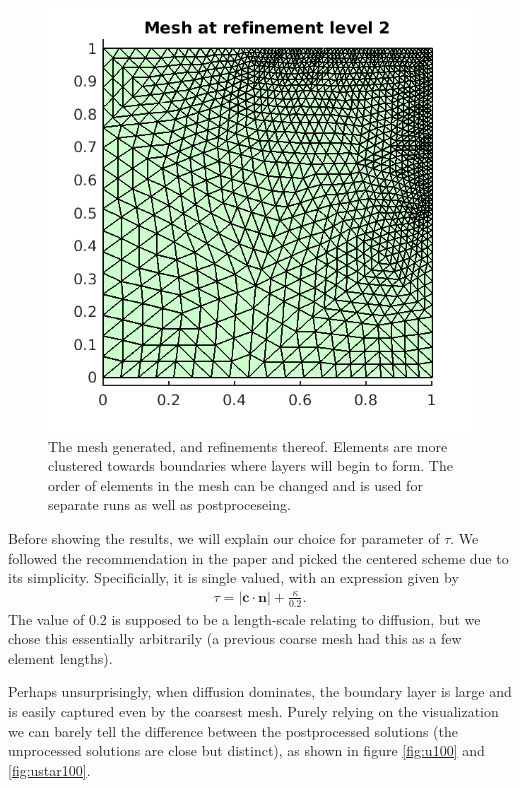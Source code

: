 \documentclass{article}
\begin{document}
\begin{figure}[!ht]
\includegraphics[scale=0.5]{um_3.png}
\caption{The mesh generated, and refinements thereof. Elements are more clustered towards boundaries where layers will begin to form. The order of elements in the mesh can be changed and is used for separate runs as well as postproceseing.}
\label{fig:um}
\end{figure}

Before showing the results, we will explain our choice for parameter of $\tau$.
We followed the recommendation in the paper \cite{nguyen} and picked the centered scheme due to its simplicity.
Specificially, it is single valued, with an expression given by
\begin{align}
\tau = |\mathbf{c} \cdot \mathbf{n}| + \frac{\kappa}{0.2}.
\end{align}
The value of 0.2 is supposed to be a length-scale relating to diffusion, but we chose this essentially arbitrarily (a previous coarse mesh had this as a few element lengths).

Perhaps unsurprisingly, when diffusion dominates, the boundary layer is large and is easily captured even by the coarsest mesh.
Purely relying on the visualization we can barely tell the difference between the postprocessed solutions (the unprocessed solutions are close but distinct), as shown in figure \ref{fig:u100} and \ref{fig:ustar100}.
\end{document}
